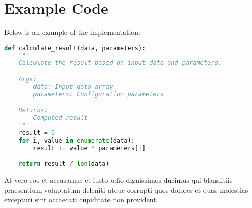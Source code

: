 \documentclass[../main.tex]{subfiles}
\begin{document}
\section{Example Code}

Below is an example of the implementation:

\begin{lstlisting}[language=Python, caption={Example implementation}]
def calculate_result(data, parameters):
    """
    Calculate the result based on input data and parameters.

    Args:
        data: Input data array
        parameters: Configuration parameters

    Returns:
        Computed result
    """
    result = 0
    for i, value in enumerate(data):
        result += value * parameters[i]

    return result / len(data)
\end{lstlisting}

At vero eos et accusamus et iusto odio dignissimos ducimus qui blanditiis praesentium voluptatum deleniti atque corrupti quos dolores et quas molestias excepturi sint occaecati cupiditate non provident.
\end{document}
